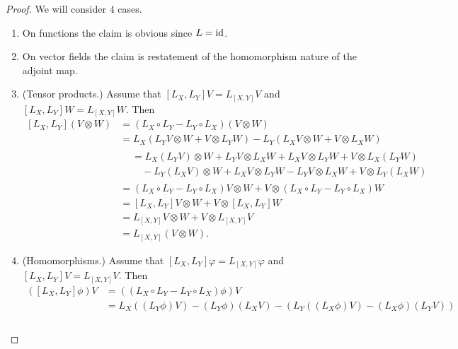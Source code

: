 \begin{proof}
  We will consider $4$ cases.
  \begin{enumerate}
    \item
      On functions the claim is obvious since $L = \mathop{\rm id}\nolimits$.
    \item
      On vector fields the claim is restatement of the homomorphism nature of
      the adjoint map.
    \item
      (Tensor products.)
      Assume that
      $[L_X , L_Y] V = L_{[X, Y]} V$ and
      $[L_X , L_Y] W = L_{[X, Y]} W$.
      Then
      \begin{equation}
        \begin{split}
          [L_X , L_Y](V \otimes W)
          & = (L_X \circ L_Y - L_Y \circ L_X)(V \otimes W) \\
          & = L_X(L_Y V \otimes W + V \otimes L_Y W)
            - L_Y(L_X V \otimes W + V \otimes L_X W) \\
          & \begin{split}
              & = L_X(L_Y V) \otimes W + L_Y V \otimes L_X W
                + L_X V \otimes L_Y W + V \otimes L_X(L_Y W) \\
              & \quad - L_Y(L_X V) \otimes W + L_X V \otimes L_Y W
                - L_Y V \otimes L_X W + V \otimes L_Y(L_X W)
            \end{split} \\
          & = (L_X \circ L_Y - L_Y \circ L_X) V \otimes W
            + V \otimes (L_X \circ L_Y - L_Y \circ L_X) W \\
          & = [L_X, L_Y] V \otimes W + V \otimes [L_X, L_Y] W \\
          & = L_{[X, Y]} V \otimes W + V \otimes L_{[X, Y]} V \\
          & = L_{[X, Y]}(V \otimes W).
        \end{split}
      \end{equation}
    \item
      (Homomorphisms.)
      Assume that
      $[L_X , L_Y] \varphi = L_{[X, Y]} \varphi$ and
      $[L_X , L_Y] V = L_{[X, Y]} V$.
      Then
      \begin{equation}
        \begin{split}
          ([L_X , L_Y] \phi) V
          & = ((L_X \circ L_Y - L_Y \circ L_X) \phi) V \\
          & = L_X((L_Y \phi) V) - (L_Y \phi) (L_X V)
            - (L_Y((L_X \phi) V) - (L_X \phi) (L_Y V)) \\
          & \begin{split}

\end{split}
\end{split}
\end{equation}
\end{enumerate}
\end{proof}
